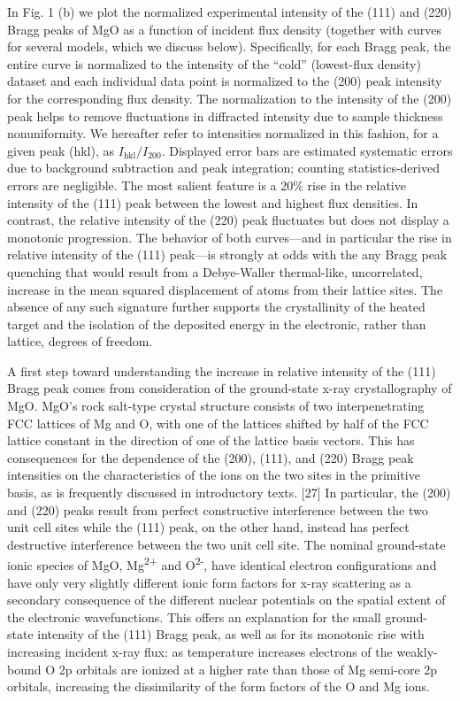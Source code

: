 In Fig. 1 (b) we plot the normalized experimental intensity of the (111)
and (220) Bragg peaks of MgO as a function of incident flux density
(together with curves for several models, which we discuss below).
Specifically, for each Bragg peak, the entire curve is normalized to the
intensity of the ``cold'' (lowest-flux density) dataset and each
individual data point is normalized to the (200) peak intensity for the
corresponding flux density. The normalization to the intensity of the
(200) peak helps to remove fluctuations in diffracted intensity due to
sample thickness nonuniformity. We hereafter refer to intensities
normalized in this fashion, for a given peak (hkl), as
\(I_{\text{hkl}}/I_{200}\). Displayed error bars are estimated
systematic errors due to background subtraction and peak integration;
counting statistics-derived errors are negligible. The most salient
feature is a 20\% rise in the relative intensity of the (111) peak
between the lowest and highest flux densities. In contrast, the relative
intensity of the (220) peak fluctuates but does not display a monotonic
progression. The behavior of both curves---and in particular the rise in
relative intensity of the (111) peak---is strongly at odds with the any
Bragg peak quenching that would result from a Debye-Waller thermal-like,
uncorrelated, increase in the mean squared displacement of atoms from
their lattice sites. The absence of any such signature further supports
the crystallinity of the heated target and the isolation of the
deposited energy in the electronic, rather than lattice, degrees of
freedom.

A first step toward understanding the increase in relative intensity of
the (111) Bragg peak comes from consideration of the ground-state x-ray
crystallography of MgO. MgO's rock salt-type crystal structure consists
of two interpenetrating FCC lattices of Mg and O, with one of the
lattices shifted by half of the FCC lattice constant in the direction of
one of the lattice basis vectors. This has consequences for the
dependence of the (200), (111), and (220) Bragg peak intensities on the
characteristics of the ions on the two sites in the primitive basis, as
is frequently discussed in introductory texts. {[}27{]} In particular,
the (200) and (220) peaks result from perfect constructive interference
between the two unit cell sites while the (111) peak, on the other hand,
instead has perfect destructive interference between the two unit cell
site. The nominal ground-state ionic species of MgO,
Mg\textsuperscript{2+} and O\textsuperscript{2-}, have identical
electron configurations and have only very slightly different ionic form
factors for x-ray scattering as a secondary consequence of the different
nuclear potentials on the spatial extent of the electronic
wavefunctions. This offers an explanation for the small ground-state
intensity of the (111) Bragg peak, as well as for its monotonic rise
with increasing incident x-ray flux: as temperature increases electrons
of the weakly-bound O 2p orbitals are ionized at a higher rate than
those of Mg semi-core 2p orbitals, increasing the dissimilarity of the
form factors of the O and Mg ions.

